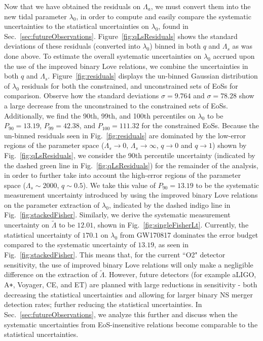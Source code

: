 \documentclass[prd,twocolumn,nofootinbib,superscriptaddress,amsmath,amssymb]{revtex4-1}
\begin{document}
Now that we have obtained the residuals on $\Lambda_a$, we must convert them into the new tidal parameter $\lambda_0$, in order to compute and easily compare the systematic uncertainties to the statistical uncertainties on $\lambda_0$, found in Sec.~\ref{sec:futureObservations}.
Figure~\ref{fig:qLsResiduals} shows the standard deviations of these residuals (converted into $\lambda_0$) binned in both $q$ and $\Lambda_s$ as was done above. 
To estimate the overall systematic uncertainties on $\lambda_0$ accrued upon the use of the improved binary Love relations, we combine the uncertainties in both $q$ and $\Lambda_s$.
Figure~\ref{fig:residuals} displays the un-binned Gaussian distribution of $\lambda_0$ residuals for both the constrained, and unconstrained sets of EoSs for comparison.
Observe how the standard deviations $\sigma=9.764$ and $\sigma=78.28$ show a large decrease from the unconstrained to the constrained sets of EoSs.
Additionally, we find the 90th, 99th, and 100th percentiles on $\lambda_0$ to be $P_{90}=13.19$, $P_{99}=42.38$, and $P_{100}=111.32$ for the constrained EoSs.
Because the un-binned residuals seen in Fig.~\ref{fig:residuals} are dominated by the low-error regions of the parameter space ($\Lambda_s \rightarrow 0$, $\Lambda_s \rightarrow \infty$, $q \rightarrow 0$ and $q \rightarrow 1$) shown by Fig.~\ref{fig:qLsResiduals}, we consider the 90th percentile uncertainty (indicated by the dashed green line in Fig.~\ref{fig:qLsResiduals}) for the remainder of the analysis, in order to further take into account the high-error regions of the parameter space ($\Lambda_s \sim 2000$, $q\sim0.5$).
We take this value of $P_{90}=13.19$ to be the systematic measurement uncertainty introduced by using the improved binary Love relations on the parameter extraction of $\lambda_0$, indicated by the dashed indigo line in Fig.~\ref{fig:stackedFisher}.
Similarly, we derive the systematic measurement uncertainty on $\tilde\Lambda$ to be $12.01$, shown in Fig.~\ref{fig:singleFisherLt}.
Currently, the statistical uncertainty of $170.1$ on $\lambda_0$ from GW170817 dominates the error budget compared to the systematic uncertainty of $13.19$, as seen in Fig.~\ref{fig:stackedFisher}.
This means that, for the current ``O2" detector sensitivity, the use of improved binary Love relations will only make a negligible difference on the extraction of $\tilde\Lambda$.
However, future detectors (for example aLIGO, A\texttt{+}, Voyager, CE, and ET) are planned with large reductions in sensitivity - both decreasing the statistical uncertainties and allowing for larger binary NS merger detection rates; further reducing the statistical uncertainties.
In Sec.~\ref{sec:futureObservations}, we analyze this further and discuss when the systematic uncertainties from EoS-insensitive relations become comparable to the statistical uncertainties.
\end{document}
